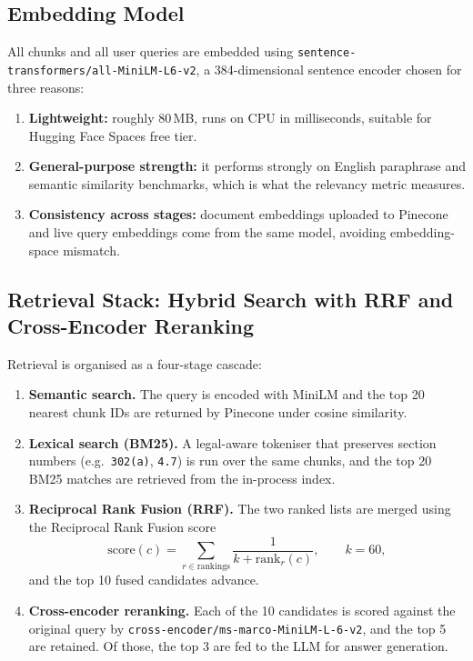 \documentclass[11pt,a4paper]{article}
\begin{document}
\subsection{Embedding Model}

All chunks and all user queries are embedded using \texttt{sentence-transformers/all-MiniLM-L6-v2}, a 384-dimensional sentence encoder chosen for three reasons:
\begin{enumerate}[leftmargin=*]
    \item \textbf{Lightweight:} roughly 80\,MB, runs on CPU in milliseconds, suitable for Hugging Face Spaces free tier.
    \item \textbf{General-purpose strength:} it performs strongly on English paraphrase and semantic similarity benchmarks, which is what the relevancy metric measures.
    \item \textbf{Consistency across stages:} document embeddings uploaded to Pinecone and live query embeddings come from the same model, avoiding embedding-space mismatch.
\end{enumerate}

\subsection{Retrieval Stack: Hybrid Search with RRF and Cross-Encoder Reranking}

Retrieval is organised as a four-stage cascade:

\begin{enumerate}[leftmargin=*]
    \item \textbf{Semantic search.} The query is encoded with MiniLM and the top 20 nearest chunk IDs are returned by Pinecone under cosine similarity.
    \item \textbf{Lexical search (BM25).} A legal-aware tokeniser that preserves section numbers (e.g.\ \texttt{302(a)}, \texttt{4.7}) is run over the same chunks, and the top 20 BM25 matches are retrieved from the in-process index.
    \item \textbf{Reciprocal Rank Fusion (RRF).} The two ranked lists are merged using the Reciprocal Rank Fusion score
    \[
        \text{score}(c) = \sum_{r \in \text{rankings}} \frac{1}{k + \text{rank}_r(c)}, \qquad k = 60,
    \]
    and the top 10 fused candidates advance.
    \item \textbf{Cross-encoder reranking.} Each of the 10 candidates is scored against the original query by \texttt{cross-encoder/ms-marco-MiniLM-L-6-v2}, and the top 5 are retained. Of those, the top 3 are fed to the LLM for answer generation.
\end{enumerate}
\end{document}
